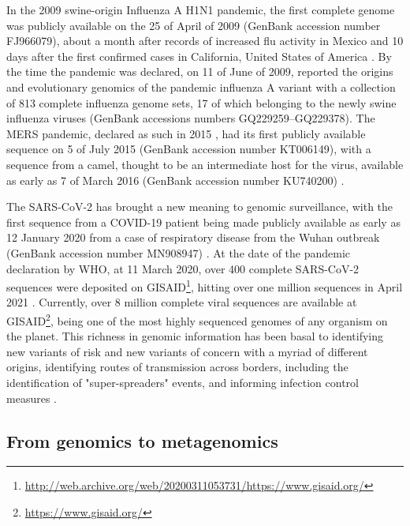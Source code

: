 In the 2009 swine-origin Influenza A H1N1 pandemic, the first complete genome was publicly available on the 25 of April of 2009 (GenBank accession number FJ966079), about a month after records of increased flu activity in Mexico and 10 days after the first confirmed cases in California, United States of America \citep{smith_origins_2009, novel_swine-origin_influenza_a_h1n1_virus_investigation_team_emergence_2009}. 
By the time the pandemic was declared, on 11 of June of 2009, \cite{smith_origins_2009} reported the origins and evolutionary genomics of the pandemic influenza A variant with a collection of 813 complete influenza genome sets, 17 of which belonging to the newly swine influenza viruses (GenBank accessions numbers GQ229259–GQ229378). 
The \ac{MERS} pandemic, declared as such in 2015 \citep{piret_pandemics_2021}, had its first publicly available sequence on 5 of July 2015 (GenBank accession number KT006149)\citep{lu_complete_2015}, with a sequence from a camel, thought to be an intermediate host for the virus, available as early as 7 of March 2016 (GenBank accession number KU740200) \citep{kandeil_complete_2016, al-shomrani_genomic_2020}. 

The \ac{SARS-CoV-2} has brought a new meaning to genomic surveillance, with the first sequence from a COVID-19 patient being made publicly available as early as 12 January 2020 from a case of respiratory disease from the Wuhan outbreak (GenBank accession number MN908947) \citep{wu_new_2020}. 
At the date of the pandemic declaration by WHO, at 11 March 2020, over 400 complete \ac{SARS-CoV-2} sequences were deposited on GISAID\footnote{\url{http://web.archive.org/web/20200311053731/https://www.gisaid.org/}}, hitting over one million sequences in April 2021 \citep{maxmen_one_2021}. 
Currently, over 8 million complete viral sequences are available at GISAID\footnote{\url{https://www.gisaid.org/}}, being one of the most highly sequenced genomes of any organism on the planet. 
This richness in genomic information has been basal to identifying new variants of risk and new variants of concern with a myriad of different origins, identifying routes of transmission across borders, including the identification of "super-spreaders" events, and informing infection control measures \citep{lancet_genomic_2021, beckett_pandemic_2021, borges_sars-cov-2_2022}.  

\subsection{From genomics to metagenomics} \label{ssec:_intro_metagenomics}

